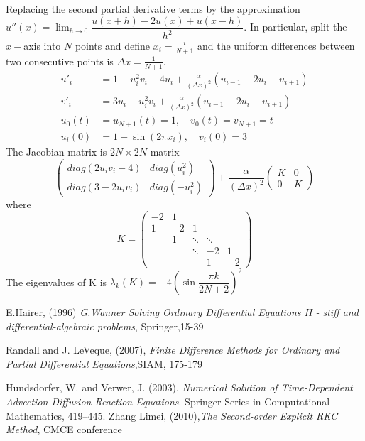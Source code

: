 \documentclass{article}
\theoremstyle{theorem}
\theoremstyle{definition}
\begin{document}
Replacing the second partial derivative terms by the approximation $u''(x) =\lim_{h \to 0} \dfrac{u(x+h)-2u(x)+u(x-h)}{h^2}$. In particular, split the $x-$axis into $N$ points and define $x_i = \frac{i}{N+1}$ and the uniform differences between two consecutive points is $\Delta x = \frac{1}{N+1}$.
$$\begin{aligned}u'_i&= 1+u_i^2v_i-4u_i+\frac{\alpha}{(\Delta x)^2} (u_{i-1}-2u_i+u_{i+1}) \\v'_i&= 3u_i-u_i^2v_i+\frac{\alpha}{(\Delta x)^2} (u_{i-1}-2u_i+u_{i+1}) \\
u_0(t)&=u_{N+1}(t)=1,\quad v_0(t)=v_{N+1}=t \\
u_i(0)&=1+\sin(2\pi x_i), \quad v_i(0)=3 \end{aligned}$$
The Jacobian matrix is $2N \times 2N$ matrix
$$ \begin{pmatrix}
diag(2u_iv_i-4)  &diag(u_i^2) \\ 
diag(3-2u_iv_i) & diag(-u_i^2)
\end{pmatrix} +\frac{\alpha}{(\Delta x)^2}\begin{pmatrix}
K &0 \\ 
0 & K
\end{pmatrix}$$
where $$K=\begin{pmatrix}
-2 &1  &  &  & \\ 
1& -2 &1  &  & \\ 
&1  &\ddots  & \ddots & \\ 
&  & \ddots &-2  &1 \\ 
&  &  &  1&-2 
\end{pmatrix}$$
The eigenvalues of K is $\lambda_k(K)=-4 \left(\sin \dfrac{\pi k}{2N+2}\right)^2$


	\begin{thebibliography}{5}
		
		E.Hairer, (1996)  \textit{G.Wanner Solving Ordinary Differential Equations II - stiff and
		differential-algebraic problems}, Springer,15-39 
		
		
	Randall and J. LeVeque, (2007), \textit{Finite Difference Methods	for Ordinary and Partial Differential Equations},SIAM,	175-179	
		
		Hundsdorfer, W. and Verwer, J. (2003). \textit{Numerical Solution of Time-Dependent Advection-Diffusion-Reaction Equations}. Springer Series in Computational Mathematics, 419–445.
		Zhang Limei, (2010),\textit{The Second-order Explicit RKC Method}, CMCE conference
	\end{thebibliography}
	
\end{document}

